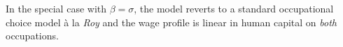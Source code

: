 \documentclass[onehalfspacing,11pt]{article}
\begin{document}
	In the special case with $\beta=\sigma$, the model reverts to a standard occupational choice model \`a la {\it Roy} and the wage profile is linear in human capital on {\it both} occupations.
	
\end{document}
